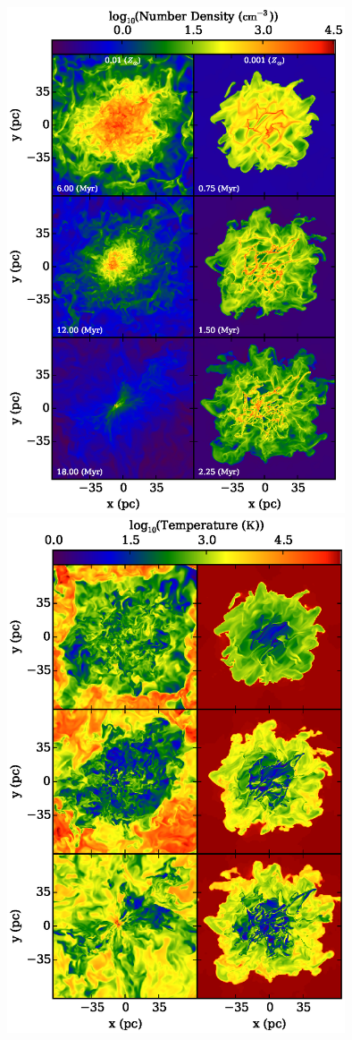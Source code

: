 \documentclass[useAMS,usenatbib]{mn2e}
\begin{document}
\begin{figure}
\begin{center}
\hspace{-1.2cm}
\includegraphics[width=10cm]{Images/slice_number_density_panel} \hspace{-1.5cm}
\includegraphics[width=10cm]{Images/temperature_panel} \hspace{-2cm} 

\end{center}
\end{figure}
\end{document}
